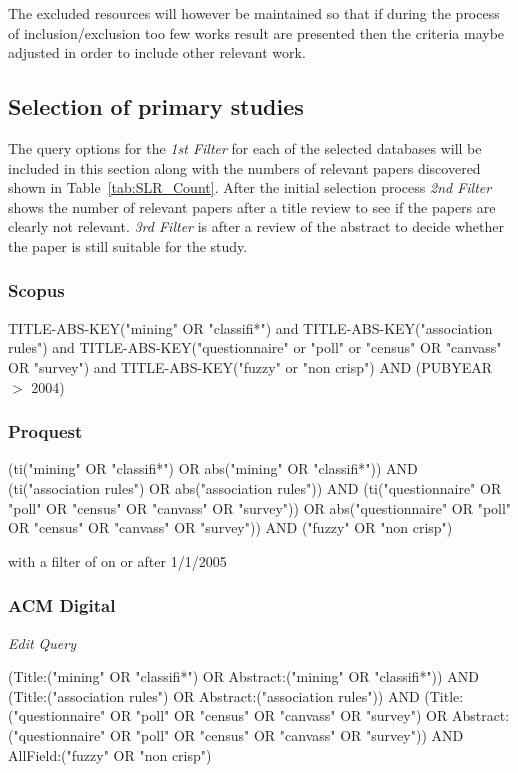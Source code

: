 \noindent
The excluded resources will however be maintained so that if during the process of inclusion/exclusion too few works result are presented then the criteria maybe adjusted in order to include other relevant work.

\subsection{Selection of primary studies}

The query options for the \textit{1st Filter} for each of the selected databases will be included in this section along with the numbers of relevant papers discovered shown in Table~\ref{tab:SLR_Count}.
After the initial selection process \textit{2nd Filter} shows the number of relevant papers after a title review to see if the papers are clearly not relevant. \textit{3rd Filter} is after a review of the abstract to decide whether the paper is still suitable for the study.



\subsubsection{Scopus}
\noindent
TITLE-ABS-KEY("mining" OR "classifi*") and TITLE-ABS-KEY("association rules") and TITLE-ABS-KEY("questionnaire" or "poll" or "census" OR "canvass" OR "survey") and TITLE-ABS-KEY("fuzzy" or "non crisp") AND (PUBYEAR $>$ 2004)

\subsubsection{Proquest}
\noindent
(ti("mining" OR "classifi*") OR abs("mining" OR "classifi*")) AND (ti("association rules") OR abs("association rules")) AND (ti("questionnaire" OR "poll" OR "census" OR "canvass" OR "survey")) OR abs("questionnaire" OR "poll" OR "census" OR "canvass" OR "survey")) AND ("fuzzy" OR "non crisp")

\noindent
with a filter of on or after 1/1/2005

\subsubsection{ACM Digital}
\noindent
\textit{Edit Query}

\noindent
(Title:("mining" OR "classifi*") OR Abstract:("mining" OR "classifi*")) AND (Title:("association rules") OR Abstract:("association rules")) AND (Title:("questionnaire" OR "poll" OR "census" OR "canvass" OR "survey") OR Abstract:("questionnaire" OR "poll" OR "census" OR "canvass" OR "survey")) AND AllField:("fuzzy" OR "non crisp")

